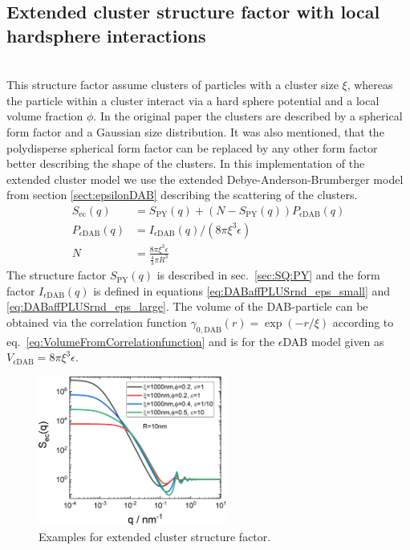 \subsection{Extended cluster structure factor with local hardsphere
interactions}~\\
\label{sec:SQec}
This structure factor assume clusters of particles with a cluster size $\xi$, whereas the particle within a cluster interact via a hard sphere potential and a local volume fraction $\phi$. In the original paper \cite{Larsen2020} the clusters are described by a spherical form factor and a Gaussian size distribution. It was also mentioned, that the polydisperse spherical form factor can be replaced by any other form factor better describing the shape of the clusters. In this implementation of the extended cluster model we use the extended Debye-Anderson-Brumberger model from section \ref{sect:epsilonDAB} describing the scattering of the clusters.
\begin{align}\label{eq:extendedClusterSQ}
  S_\mathrm{ec}(q) &= S_\mathrm{PY}(q)+\left(N-S_\mathrm{PY}(q)\right)P_{\epsilon\mathrm{DAB}}(q)\\
  P_{\epsilon\mathrm{DAB}}(q) &= I_{\epsilon\mathrm{DAB}}(q) / \left(8\pi\xi^3\epsilon\right)\\
  N &= \frac{8\pi\xi^3\epsilon}{\frac{4}{3}\pi R^3}
\end{align}
The structure factor $S_\mathrm{PY}(q)$ is described in sec.\ \ref{sec:SQ:PY} and the form factor $I_{\epsilon\mathrm{DAB}}(q)$ is defined in equations \ref{eq:DABaffPLUSrnd_eps_small} and \ref{eq:DABaffPLUSrnd_eps_large}. The volume of the DAB-particle can be obtained via the correlation function $\gamma_{0,\mathrm{DAB}}(r)=\exp(-r/\xi)$ according to eq.\ \ref{eq:VolumeFromCorrelationfunction} and is for the $\epsilon$DAB model given as $V_{\epsilon\mathrm{DAB}}=8\pi\xi^3\epsilon$.

\begin{figure}[htb]
\begin{center}
\includegraphics[width=0.55\textwidth]{../images/structure_factor/MassFractals/extendedclusterSQ.png}
\end{center}
\caption{Examples for extended cluster structure factor.}
\label{fig:SQec}
\end{figure}

